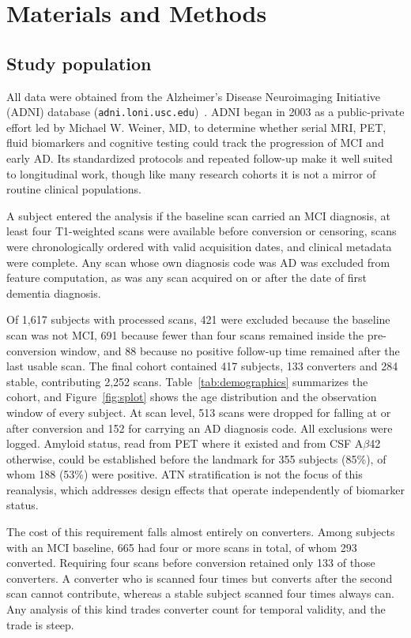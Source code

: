 \documentclass[blue]{ludusofficial}  %
\begin{document}
\section{Materials and Methods}

\subsection{Study population}

All data were obtained from the Alzheimer's Disease Neuroimaging Initiative (ADNI) database (\texttt{adni.loni.usc.edu})~\cite{weiner2010adni,petersen2010adni}. ADNI began in 2003 as a public-private effort led by Michael W. Weiner, MD, to determine whether serial MRI, PET, fluid biomarkers and cognitive testing could track the progression of MCI and early AD. Its standardized protocols and repeated follow-up make it well suited to longitudinal work, though like many research cohorts it is not a mirror of routine clinical populations.

A subject entered the analysis if the baseline scan carried an MCI diagnosis, at least four T1-weighted scans were available before conversion or censoring, scans were chronologically ordered with valid acquisition dates, and clinical metadata were complete. Any scan whose own diagnosis code was AD was excluded from feature computation, as was any scan acquired on or after the date of first dementia diagnosis.

Of 1,617 subjects with processed scans, 421 were excluded because the baseline scan was not MCI, 691 because fewer than four scans remained inside the pre-conversion window, and 88 because no positive follow-up time remained after the last usable scan. The final cohort contained 417 subjects, 133 converters and 284 stable, contributing 2,252 scans. Table~\ref{tab:demographics} summarizes the cohort, and Figure~\ref{fig:splot} shows the age distribution and the observation window of every subject. At scan level, 513 scans were dropped for falling at or after conversion and 152 for carrying an AD diagnosis code. All exclusions were logged. Amyloid status, read from PET where it existed and from CSF A$\beta$42 otherwise, could be established before the landmark for 355 subjects (85\%), of whom 188 (53\%) were positive. ATN stratification is not the focus of this reanalysis, which addresses design effects that operate independently of biomarker status.

The cost of this requirement falls almost entirely on converters. Among subjects with an MCI baseline, 665 had four or more scans in total, of whom 293 converted. Requiring four scans before conversion retained only 133 of those converters. A converter who is scanned four times but converts after the second scan cannot contribute, whereas a stable subject scanned four times always can. Any analysis of this kind trades converter count for temporal validity, and the trade is steep.
\end{document}
